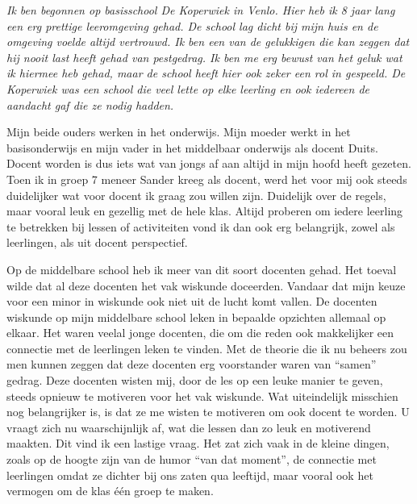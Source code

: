 \documentclass{article}
\begin{document}
            {\itshape      
                Ik ben begonnen op basisschool De Koperwiek in Venlo. Hier heb ik 8 jaar lang een erg prettige leeromgeving gehad. De school lag dicht bij mijn huis en de omgeving voelde altijd vertrouwd. Ik ben een van de gelukkigen die kan zeggen dat hij nooit last heeft gehad van pestgedrag. Ik ben me erg bewust van het geluk wat ik hiermee heb gehad, maar de school heeft hier ook zeker een rol in gespeeld. De Koperwiek was een school die veel lette op elke leerling en ook iedereen de aandacht gaf die ze nodig hadden. 
                
                Mijn beide ouders werken in het onderwijs. Mijn moeder werkt in het basisonderwijs en mijn vader in het middelbaar onderwijs als docent Duits. Docent worden is dus iets wat van jongs af aan altijd in mijn hoofd heeft gezeten. Toen ik in groep 7 meneer Sander kreeg als docent, werd het voor mij ook steeds duidelijker wat voor docent ik graag zou willen zijn. Duidelijk over de regels, maar vooral leuk en gezellig met de hele klas. Altijd proberen om iedere leerling te betrekken bij lessen of activiteiten vond ik dan ook erg belangrijk, zowel als leerlingen, als uit docent perspectief. 
                
                Op de middelbare school heb ik meer van dit soort docenten gehad. Het toeval wilde dat al deze docenten het vak wiskunde doceerden. Vandaar dat mijn keuze voor een minor in wiskunde ook niet uit de lucht komt vallen. De docenten wiskunde op mijn middelbare school leken in bepaalde opzichten allemaal op elkaar. Het waren veelal jonge docenten, die om die reden ook makkelijker een connectie met de leerlingen leken te vinden. Met de theorie die ik nu beheers zou men kunnen zeggen dat deze docenten erg voorstander waren van “samen” gedrag. Deze docenten wisten mij, door de les op een leuke manier te geven, steeds opnieuw te motiveren voor het vak wiskunde. Wat uiteindelijk misschien nog belangrijker is, is dat ze me wisten te motiveren om ook docent te worden. U vraagt zich nu waarschijnlijk af, wat die lessen dan zo leuk en motiverend maakten. Dit vind ik een lastige vraag. Het zat zich vaak in de kleine dingen, zoals op de hoogte zijn van de humor “van dat moment”, de connectie met leerlingen omdat ze dichter bij ons zaten qua leeftijd, maar vooral ook het vermogen om de klas één groep te maken. 
                
}
\end{document}

